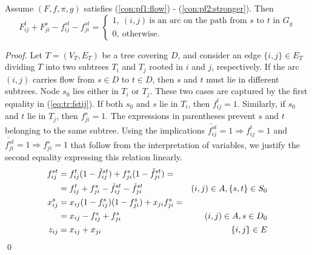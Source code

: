 \begin{prop}\label{prop:transX}
Assume $(F,f,\pi,g)$ satisfies (\ref{con:pf1:flow}) - (\ref{con:pf2:stronger}). Then
$$
F^t_{ij}+F^s_{ji}-f^{st}_{ij}-f^{st}_{ji} = 
	\begin{cases}
		1, ~(i,j)~\text{is an arc on the path from~$s$ to $t$ in $G_{g}$} \\
		0, ~\text{otherwise.}
	\end{cases}
$$
\end{prop}
%
\begin{proof}

Let $T=(V_T,E_T)$ be a tree covering $D$, and consider an edge $\{i,j\}\in E_T$ dividing $T$ into two subtrees $T_i$ and $T_j$ rooted in $i$ and $j$, respectively.
If the arc $(i,j)$ carries flow from $s\in D$ to $t\in D$, then $s$ and $t$ must lie in different subtrees.
Node $s_0$ lies either in $T_i$ or $T_j$.
These two cases are captured by the first equality in (\ref{eq:tr:fstij}).
If both $s_0$ and $s$ lie in $T_i$, then $f_{ij}^t=1$.
Similarly, if $s_0$ and $t$ lie in $T_j$, then $f_{ji}^s=1$.
The expressions in parentheses prevent $s$ and $t$ belonging to the same subtree.
Using the implications $\check{f^{st}_{ij}}=1\Rightarrow f_{ij}^t=1$ and $\check{f^{st}_{ji}}=1\Rightarrow f_{ji}^s=1$ that follow from the interpretation of variables, we justify the second equality expressing this relation linearly.
\begin{subequations}
\begin{align}
\notag\label{eq:tr:fstij}f^{st}_{ij}&=f^t_{ij}(1-\check{f}^{st}_{ij})+f^{s}_{ji}(1-\check{f}^{st}_{ji})= \\
  &=  f^t_{ij}+f^s_{ji} - \check{f}^{st}_{ij} - \check{f}^{st}_{ji}& (i,j)\in A, \{s,t\}\in S_0\\
\notag\label{eq:tr:xijj}x^s_{ij}&=x_{ij}(1-f^{s}_{ij})(1-f^{s}_{ji})+x_{ji}f^{s}_{ji}=\\
  &= x_{ij}-f^s_{ij} + f^{s}_{ji} & (i,j)\in A, s\in D_0\\
\label{eq:tr:zij}z_{ij}&=x_{ij}+x_{ji}& \{i,j\}\in E
\end{align}
\end{subequations}
\qed
\end{proof}
